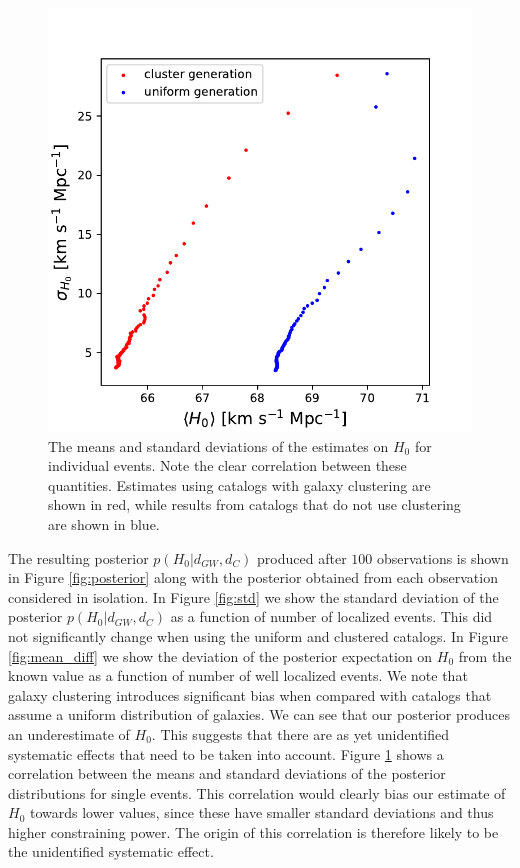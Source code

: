 \begin{figure}[b]
    \centering
    \includegraphics[width=\columnwidth]{figures/correlation.pdf}
    \caption{The means and standard deviations of the estimates on $H_0$ for individual events. Note the clear correlation between these quantities. Estimates using catalogs with galaxy clustering are shown in red, while results from catalogs that do not use clustering are shown in blue.}
    \label{fig:correlation}
\end{figure}

The resulting posterior $p(H_0 | d_{GW}, d_C)$ produced after $100$ observations is shown in Figure \ref{fig:posterior} along with the posterior obtained from each observation considered in isolation.
In Figure \ref{fig:std} we show the standard deviation of the posterior $p(H_0 | d_{GW}, d_C)$ as a function of number of localized events. This did not significantly change when using the uniform and clustered catalogs.
In Figure \ref{fig:mean_diff} we show the deviation of the posterior expectation on $H_0$ from the known value as a function of number of well localized events. We note that galaxy clustering introduces significant bias when compared with catalogs that assume a uniform distribution of galaxies.
We can see that our posterior produces an underestimate of $H_0$.
This suggests that there are as yet unidentified systematic effects that need to be taken into account.
Figure \ref{fig:correlation} shows a correlation between the means and standard deviations of the posterior distributions for single events.
This correlation would clearly bias our estimate of $H_0$ towards lower values, since these have smaller standard deviations and thus higher constraining power.
The origin of this correlation is therefore likely to be the unidentified systematic effect.
